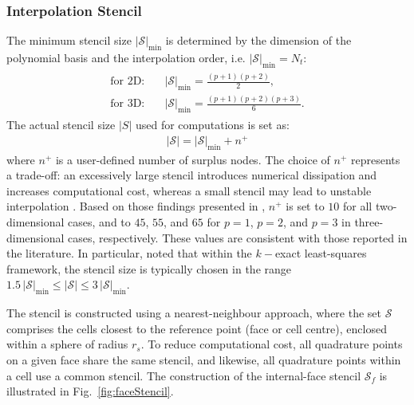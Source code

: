 \documentclass[review,3p]{elsarticle}
\begin{document}
\subsubsection{Interpolation Stencil}
\label{sec:stencil}
%
The minimum stencil size $|\mathcal{S}|_{\text{min}}$ is determined by the dimension of the polynomial basis and the interpolation order, i.e. $|\mathcal{S}|_{\text{min}} = N_t$:
\begin{eqnarray}
	\begin{split}
		\text{for 2D:}\quad & |\mathcal{S}|_{\text{min}} = \frac{(p+1)(p+2)}{2}, \\
		\text{for 3D:}\quad & |\mathcal{S}|_{\text{min}} =\frac{(p+1)(p+2)(p+3)}{6}.
	\end{split}
\end{eqnarray}
%
The actual stencil size $|S|$ used for computations is set as:
%
\begin{eqnarray}
	|\mathcal{S}| = |\mathcal{S}|_{\text{min}} + n^+
\end{eqnarray}
where $n^{+}$ is a user-defined number of surplus nodes. The choice of $n^{+}$ represents a trade-off: an excessively large stencil introduces numerical dissipation and increases computational cost, whereas a small stencil may lead to unstable interpolation \cite{Khelladi2011}.
Based on those findings presented in \cite{Castrillo2022,Castrillo2024}, $n^{+}$ is set to $10$ for all two-dimensional cases, and to $45$, $55$, and $65$ for $p = 1$, $p = 2$, and $p = 3$ in three-dimensional cases, respectively. These values are consistent with those reported in the literature. In particular, \cite{Tsoutsanis2023} noted that within the $k-$exact least-squares framework, the stencil size is typically chosen in the range $1.5\,|\mathcal{S}|_{\text{min}} \leq |\mathcal{S}| \leq 3\,|\mathcal{S}|_{\text{min}}$.

The stencil is constructed using a nearest-neighbour approach, where the set $\mathcal{S}$ comprises the cells closest to the reference point (face or cell centre), enclosed within a sphere of radius $r_s$. To reduce computational cost, all quadrature points on a given face share the same stencil, and likewise, all quadrature points within a cell use a common stencil. The construction of the internal-face stencil $\mathcal{S}_f$ is illustrated in Fig.~\ref{fig:faceStencil}.
\end{document}
